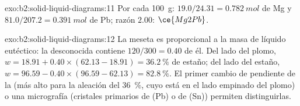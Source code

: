 \begin{solution}{exo:b2:solid-liquid-diagrams:11}
Por cada \qty{100}{g}: $19.0/24.31 = \qty{0.782}{mol}$ de Mg y $81.0/207.2 =
\qty{0.391}{mol}$ de Pb; razón $2.00$: $\ce{Mg2Pb}$.
\end{solution}

\begin{solution}{exo:b2:solid-liquid-diagrams:12}
La meseta es proporcional a la masa de líquido eutéctico: la desconocida contiene
$120/300 = 0.40$ de él. Del lado del plomo, $w = 18.91 + 0.40 \times (62.13 -
18.91) = 36.2~\%$ de estaño; del lado del estaño, $w = 96.59 - 0.40 \times (96.59 - 62.13) =
82.8~\%$. El primer cambio de pendiente de la  (más alto para la aleación del 36~\%,
cuyo  está en el lado empinado del plomo) o una micrografía (cristales primarios de (Pb) o
de (Sn)) permiten distinguirlas.
\end{solution}

